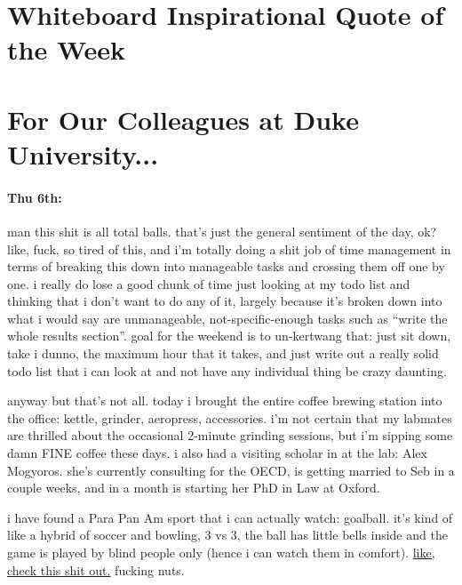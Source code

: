 \documentclass[12pt]{article}
\begin{document}
\newpage
\section*{Whiteboard Inspirational Quote of the Week}
\begin{quote}
\end{quote} 

\section*{For Our Colleagues at Duke University...}
\paragraph{Thu 6th:} man this shit is all total balls. that's just the general sentiment of the day, ok? like, fuck, so tired of this, and i'm totally doing a shit job of time management in terms of breaking this down into manageable tasks and crossing them off one by one. i really do lose a good chunk of time just looking at my todo list and thinking that i don't want to do any of it, largely because it's broken down into what i would say are unmanageable, not-specific-enough tasks such as ``write the whole results section''. goal for the weekend is to un-kertwang that: just sit down, take i dunno, the maximum hour that it takes, and just write out a really solid todo list that i can look at and not have any individual thing be crazy daunting. \par
anyway but that's not all. today i brought the entire coffee brewing station into the office: kettle, grinder, aeropress, accessories. i'm not certain that my labmates are thrilled about the occasional 2-minute grinding sessions, but i'm sipping some damn FINE coffee these days. i also had a visiting scholar in at the lab: Alex Mogyoros. she's currently consulting for the OECD, is getting married to Seb in a couple weeks, and in a month is starting her PhD in Law at Oxford.\par
i have found a Para Pan Am sport that i can actually watch: goalball. it's kind of like a hybrid of soccer and bowling, 3 vs 3, the ball has little bells inside and the game is played by blind people only (hence i can watch them in comfort). \href{https://youtu.be/Zj6galPLxmQ}{like, check this shit out.} fucking nuts.
\end{document}
